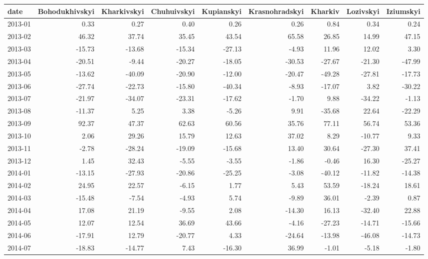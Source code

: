 \begin{table}[ht]
\centering
\begin{tabular}{lrrrrrrrr}
  \hline
date & Bohodukhivskyi & Kharkivskyi & Chuhuivskyi & Kupianskyi & Krasnohradskyi & Kharkiv & Lozivskyi & Iziumskyi \\ 
  \hline
2013-01 & 0.33 & 0.27 & 0.40 & 0.26 & 0.26 & 0.84 & 0.34 & 0.24 \\ 
  2013-02 & 46.32 & 37.74 & 35.45 & 43.54 & 65.58 & 26.85 & 14.99 & 47.15 \\ 
  2013-03 & -15.73 & -13.68 & -15.34 & -27.13 & -4.93 & 11.96 & 12.02 & 3.30 \\ 
  2013-04 & -20.51 & -9.44 & -20.27 & -18.05 & -30.53 & -27.67 & -21.30 & -47.99 \\ 
  2013-05 & -13.62 & -40.09 & -20.90 & -12.00 & -20.47 & -49.28 & -27.81 & -17.73 \\ 
  2013-06 & -27.74 & -22.73 & -15.80 & -40.34 & -8.93 & -17.07 & 3.82 & -30.22 \\ 
  2013-07 & -21.97 & -34.07 & -23.31 & -17.62 & -1.70 & 9.88 & -34.22 & -1.13 \\ 
  2013-08 & -11.37 & 5.25 & 3.38 & -5.26 & 9.91 & -35.68 & 22.64 & -22.29 \\ 
  2013-09 & 92.37 & 47.37 & 62.63 & 60.56 & 35.76 & 77.11 & 56.74 & 53.36 \\ 
  2013-10 & 2.06 & 29.26 & 15.79 & 12.63 & 37.02 & 8.29 & -10.77 & 9.33 \\ 
  2013-11 & -2.78 & -28.24 & -19.09 & -15.68 & 13.40 & 30.64 & -27.30 & 37.41 \\ 
  2013-12 & 1.45 & 32.43 & -5.55 & -3.55 & -1.86 & -0.46 & 16.30 & -25.27 \\ 
  2014-01 & -13.15 & -27.93 & -20.86 & -25.25 & -3.08 & -40.12 & -11.82 & -14.38 \\ 
  2014-02 & 24.95 & 22.57 & -6.15 & 1.77 & 5.43 & 53.59 & -18.24 & 18.61 \\ 
  2014-03 & -15.48 & -7.54 & -4.93 & 5.74 & -9.89 & 36.01 & -2.39 & 0.87 \\ 
  2014-04 & 17.08 & 21.19 & -9.55 & 2.08 & -14.30 & 16.13 & -32.40 & 22.88 \\ 
  2014-05 & 12.07 & 12.54 & 36.69 & 43.66 & -4.16 & -27.23 & -14.71 & -15.66 \\ 
  2014-06 & -17.91 & 12.79 & -20.77 & 4.33 & -24.64 & -13.98 & -46.08 & -14.73 \\ 
  2014-07 & -18.83 & -14.77 & 7.43 & -16.30 & 36.99 & -1.01 & -5.18 & -1.80 \\ 

\end{tabular}
\end{table}

